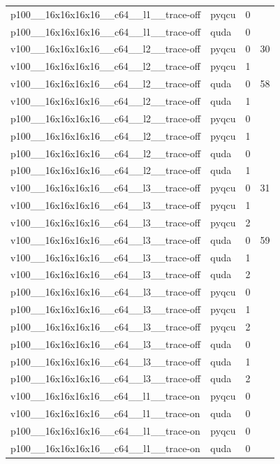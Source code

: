 \begin{table}[htbp]
\begin{tabular}{@{}llrr@{}}
p100\_\_16x16x16x16\_\_c64\_\_l1\_\_trace-off & pyqcu & 0 &  \\
p100\_\_16x16x16x16\_\_c64\_\_l1\_\_trace-off & quda & 0 &  \\
v100\_\_16x16x16x16\_\_c64\_\_l2\_\_trace-off & pyqcu & 0 & 30 \\
v100\_\_16x16x16x16\_\_c64\_\_l2\_\_trace-off & pyqcu & 1 &  \\
v100\_\_16x16x16x16\_\_c64\_\_l2\_\_trace-off & quda & 0 & 58 \\
v100\_\_16x16x16x16\_\_c64\_\_l2\_\_trace-off & quda & 1 &  \\
p100\_\_16x16x16x16\_\_c64\_\_l2\_\_trace-off & pyqcu & 0 &  \\
p100\_\_16x16x16x16\_\_c64\_\_l2\_\_trace-off & pyqcu & 1 &  \\
p100\_\_16x16x16x16\_\_c64\_\_l2\_\_trace-off & quda & 0 &  \\
p100\_\_16x16x16x16\_\_c64\_\_l2\_\_trace-off & quda & 1 &  \\
v100\_\_16x16x16x16\_\_c64\_\_l3\_\_trace-off & pyqcu & 0 & 31 \\
v100\_\_16x16x16x16\_\_c64\_\_l3\_\_trace-off & pyqcu & 1 &  \\
v100\_\_16x16x16x16\_\_c64\_\_l3\_\_trace-off & pyqcu & 2 &  \\
v100\_\_16x16x16x16\_\_c64\_\_l3\_\_trace-off & quda & 0 & 59 \\
v100\_\_16x16x16x16\_\_c64\_\_l3\_\_trace-off & quda & 1 &  \\
v100\_\_16x16x16x16\_\_c64\_\_l3\_\_trace-off & quda & 2 &  \\
p100\_\_16x16x16x16\_\_c64\_\_l3\_\_trace-off & pyqcu & 0 &  \\
p100\_\_16x16x16x16\_\_c64\_\_l3\_\_trace-off & pyqcu & 1 &  \\
p100\_\_16x16x16x16\_\_c64\_\_l3\_\_trace-off & pyqcu & 2 &  \\
p100\_\_16x16x16x16\_\_c64\_\_l3\_\_trace-off & quda & 0 &  \\
p100\_\_16x16x16x16\_\_c64\_\_l3\_\_trace-off & quda & 1 &  \\
p100\_\_16x16x16x16\_\_c64\_\_l3\_\_trace-off & quda & 2 &  \\
v100\_\_16x16x16x16\_\_c64\_\_l1\_\_trace-on & pyqcu & 0 &  \\
v100\_\_16x16x16x16\_\_c64\_\_l1\_\_trace-on & quda & 0 &  \\
p100\_\_16x16x16x16\_\_c64\_\_l1\_\_trace-on & pyqcu & 0 &  \\
p100\_\_16x16x16x16\_\_c64\_\_l1\_\_trace-on & quda & 0 &  \\

\end{tabular}
\end{table}
